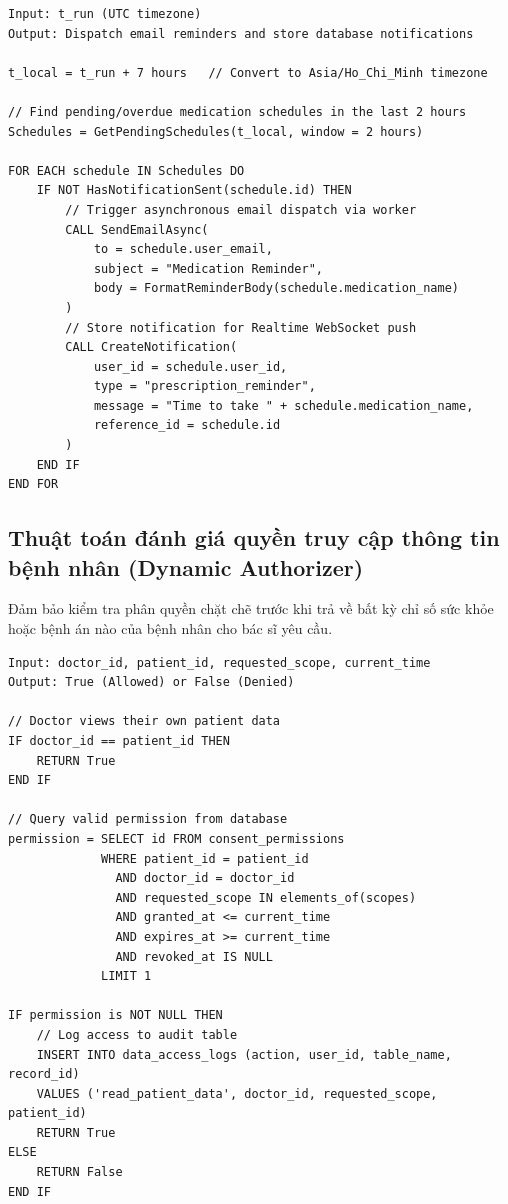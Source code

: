 \documentclass[12pt,a4paper]{report}
\begin{document}
\begin{lstlisting}[caption={Thuật toán Quét và Gửi nhắc nhở}, label={alg:reminder}, basicstyle=\small\ttfamily, frame=single]
Input: t_run (UTC timezone)
Output: Dispatch email reminders and store database notifications

t_local = t_run + 7 hours   // Convert to Asia/Ho_Chi_Minh timezone

// Find pending/overdue medication schedules in the last 2 hours
Schedules = GetPendingSchedules(t_local, window = 2 hours)

FOR EACH schedule IN Schedules DO
    IF NOT HasNotificationSent(schedule.id) THEN
        // Trigger asynchronous email dispatch via worker
        CALL SendEmailAsync(
            to = schedule.user_email, 
            subject = "Medication Reminder", 
            body = FormatReminderBody(schedule.medication_name)
        )
        // Store notification for Realtime WebSocket push
        CALL CreateNotification(
            user_id = schedule.user_id,
            type = "prescription_reminder",
            message = "Time to take " + schedule.medication_name,
            reference_id = schedule.id
        )
    END IF
END FOR
\end{lstlisting}

\subsection{Thuật toán đánh giá quyền truy cập thông tin bệnh nhân (Dynamic Authorizer)}
Đảm bảo kiểm tra phân quyền chặt chẽ trước khi trả về bất kỳ chỉ số sức khỏe hoặc bệnh án nào của bệnh nhân cho bác sĩ yêu cầu.

\begin{lstlisting}[caption={Thuật toán Kiểm tra Quyền truy cập}, label={alg:auth_consent}, basicstyle=\small\ttfamily, frame=single]
Input: doctor_id, patient_id, requested_scope, current_time
Output: True (Allowed) or False (Denied)

// Doctor views their own patient data
IF doctor_id == patient_id THEN
    RETURN True
END IF

// Query valid permission from database
permission = SELECT id FROM consent_permissions
             WHERE patient_id = patient_id
               AND doctor_id = doctor_id
               AND requested_scope IN elements_of(scopes)
               AND granted_at <= current_time
               AND expires_at >= current_time
               AND revoked_at IS NULL
             LIMIT 1

IF permission is NOT NULL THEN
    // Log access to audit table
    INSERT INTO data_access_logs (action, user_id, table_name, record_id)
    VALUES ('read_patient_data', doctor_id, requested_scope, patient_id)
    RETURN True
ELSE
    RETURN False
END IF
\end{lstlisting}
\end{document}

